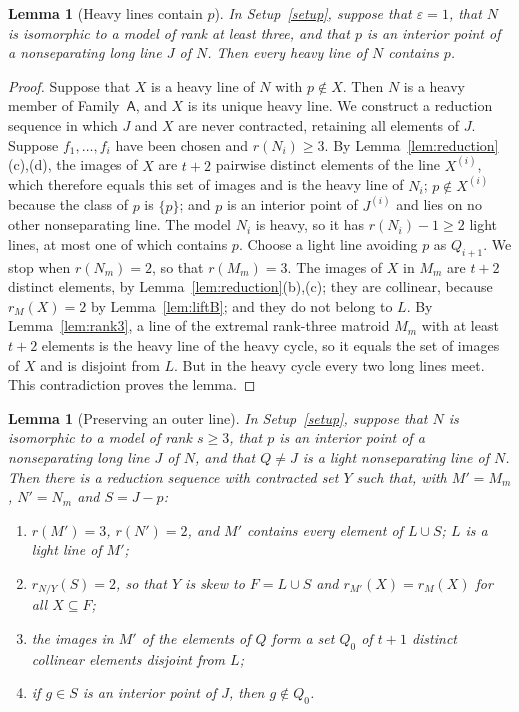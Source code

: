 \documentclass[11pt]{amsart}
\newtheorem{lemma}[theorem]{Lemma}
\theoremstyle{definition}
\theoremstyle{remark}
\numberwithin{equation}{section}
\newcommand{\FA}{\mathsf{A}}
\begin{document}
\begin{lemma}[Heavy lines contain $p$]\label{lem:heavyprotect}
In Setup~\textup{\ref{setup}}, suppose that $\varepsilon=1$, that $N$ is isomorphic to a model of rank at least three, and that $p$ is an interior point of a nonseparating long line $J$ of $N$. Then every heavy line of $N$ contains $p$.
\end{lemma}

\begin{proof}
Suppose that $X$ is a heavy line of $N$ with $p\notin X$. Then $N$ is a heavy member of Family~$\FA$, and $X$ is its unique heavy line. We construct a reduction sequence in which $J$ and $X$ are never contracted, retaining all elements of $J$. Suppose $f_1,\dots,f_i$ have been chosen and $r(N_i)\ge3$. By Lemma~\ref{lem:reduction}(c),(d), the images of $X$ are $t+2$ pairwise distinct elements of the line $X^{(i)}$, which therefore equals this set of images and is the heavy line of $N_i$; $p\notin X^{(i)}$ because the class of $p$ is $\{p\}$; and $p$ is an interior point of $J^{(i)}$ and lies on no other nonseparating line. The model $N_i$ is heavy, so it has $r(N_i)-1\ge2$ light lines, at most one of which contains $p$. Choose a light line avoiding $p$ as $Q_{i+1}$. We stop when $r(N_m)=2$, so that $r(M_m)=3$. The images of $X$ in $M_m$ are $t+2$ distinct elements, by Lemma~\ref{lem:reduction}(b),(c); they are collinear, because $r_M(X)=2$ by Lemma~\ref{lem:liftB}; and they do not belong to $L$. By Lemma~\ref{lem:rank3}, a line of the extremal rank-three matroid $M_m$ with at least $t+2$ elements is the heavy line of the heavy cycle, so it equals the set of images of $X$ and is disjoint from $L$. But in the heavy cycle every two long lines meet. This contradiction proves the lemma.
\end{proof}

\begin{lemma}[Preserving an outer line]\label{lem:protected}
In Setup~\textup{\ref{setup}}, suppose that $N$ is isomorphic to a model of rank $s\ge3$, that $p$ is an interior point of a nonseparating long line $J$ of $N$, and that $Q\ne J$ is a light nonseparating line of $N$. Then there is a reduction sequence with contracted set $Y$ such that, with $M'=M_m$, $N'=N_m$ and $S=J-p$:
\begin{enumerate}[label=\textup{(\roman*)}]
\item $r(M')=3$, $r(N')=2$, and $M'$ contains every element of $L\cup S$; $L$ is a light line of $M'$;
\item $r_{N/Y}(S)=2$, so that $Y$ is skew to $F=L\cup S$ and $r_{M'}(X)=r_M(X)$ for all $X\subseteq F$;
\item the images in $M'$ of the elements of $Q$ form a set $Q_0$ of $t+1$ distinct collinear elements disjoint from $L$;
\item if $g\in S$ is an interior point of $J$, then $g\notin Q_0$.
\end{enumerate}
\end{lemma}
\end{document}
